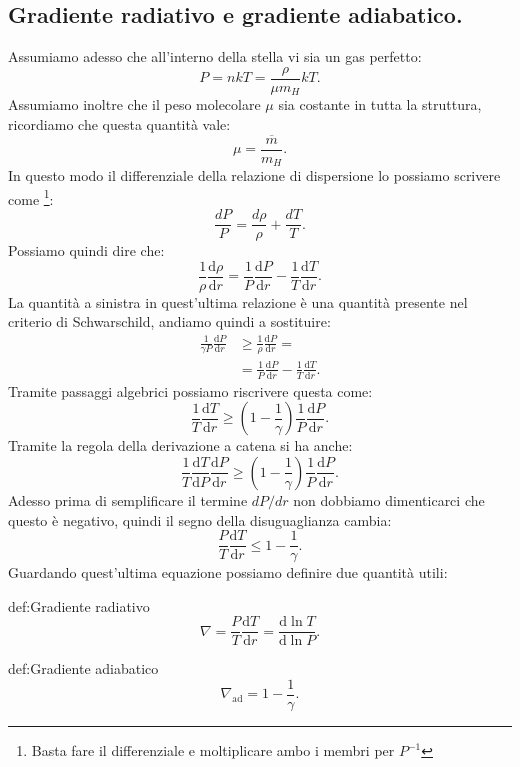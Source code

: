\subsection{Gradiente radiativo e gradiente adiabatico.}
\label{subsec:Gradiente radiativo e gradiente adiabatico.}
Assumiamo adesso che all'interno della stella vi sia un gas perfetto: 
 \[
	P=nkT=\frac{\rho }{\mu m_{H}}kT
.\] 
Assumiamo inoltre che il peso molecolare $\mu$ sia costante in tutta la struttura, ricordiamo che questa quantità vale:
\[
	\mu  = \frac{\overline{m}}{m_{H}}
.\] 
In questo modo il differenziale della relazione di dispersione lo possiamo scrivere come \footnote{Basta fare il differenziale e moltiplicare ambo i membri per $P^{-1}$}:
\[
	\frac{dP}{P}=
	\frac{d\rho }{\rho }+ \frac{dT}{T}
.\] 
Possiamo quindi dire che:
\[
	\frac{1}{\rho }\frac{\mbox{d} \rho }{\mbox{d} r} 
	=
	\frac{1}{P}\frac{\mbox{d} P}{\mbox{d} r} -
	\frac{1}{T}\frac{\mbox{d} T}{\mbox{d} r} 
.\] 
La quantità a sinistra in quest'ultima relazione è una quantità presente nel criterio di Schwarschild, andiamo quindi a sostituire:
\[\begin{aligned}
	\frac{1}{\gamma P} \frac{\mbox{d} P}{\mbox{d} r} 
	&\ge 
	\frac{1}{\rho }\frac{\mbox{d} P}{\mbox{d} r} 
	=\\
	&=
	\frac{1}{P}\frac{\mbox{d} P}{\mbox{d} r} 
	-
	\frac{1}{T}\frac{\mbox{d} T}{\mbox{d} r} 
.\end{aligned}\]
Tramite passaggi algebrici possiamo riscrivere questa come:
\[
	\frac{1}{T}\frac{\mbox{d} T}{\mbox{d} r} 
	\ge 
	\left( 1- \frac{1}{\gamma}\right) \frac{1}{P} \frac{\mbox{d} P}{\mbox{d} r} 
.\] 
Tramite la regola della derivazione a catena si ha anche:
\[
	\frac{1}{T}\frac{\mbox{d} T}{\mbox{d} P} \frac{\mbox{d} P}{\mbox{d} r} 
	\ge 
	\left( 1- \frac{1}{\gamma}\right) \frac{1}{P} \frac{\mbox{d} P}{\mbox{d} r} 
.\] 
Adesso prima di semplificare il termine $dP/dr$ non dobbiamo dimenticarci che questo è negativo, quindi il segno della disuguaglianza cambia:
\[
	\frac{P}{T}\frac{\mbox{d} T}{\mbox{d} r} \le 
	1 - \frac{1}{\gamma}
.\] 
Guardando quest'ultima equazione possiamo definire due quantità utili:
\begin{defn}[Nabla]{def:Gradiente radiativo}
	\[
		\nabla =
		\frac{P}{T}\frac{\mbox{d} T}{\mbox{d} r} 
		=
		\frac{\mbox{d} \ln T}{\mbox{d} \ln P} 
	.\] 
\end{defn}
\begin{defn}{def:Gradiente adiabatico}
	\[
		\nabla_\text{ad} =
		1 - \frac{1}{\gamma}
	.\] 
\end{defn}
